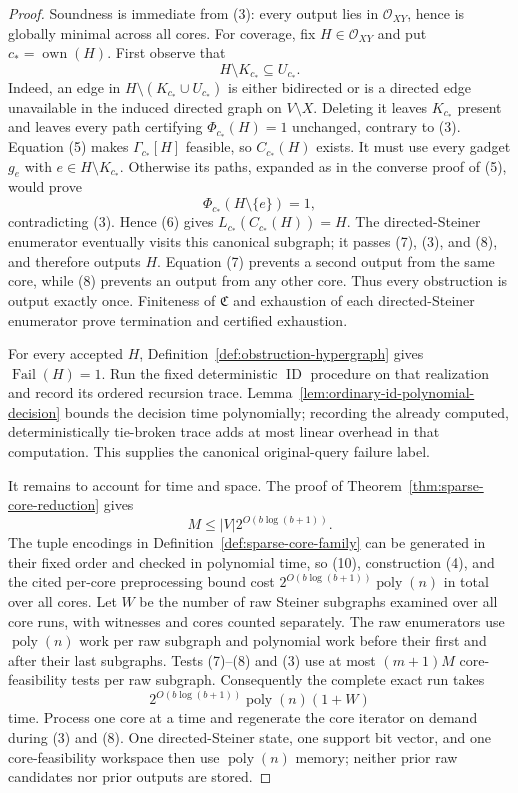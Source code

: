 \documentclass{article}
\begin{document}
\begin{proof}
Soundness is immediate from (3): every output lies in \(\mathcal O_{XY}\), hence is globally minimal across all cores.  For coverage, fix \(H\in\mathcal O_{XY}\) and put \(c_* =\operatorname{own}(H)\).  First observe that
\[
 H\setminus K_{c_*}\subseteq U_{c_*}.
 \tag{9}
\]
Indeed, an edge in \(H\setminus(K_{c_*}\cup U_{c_*})\) is either bidirected or is a directed edge unavailable in the induced directed graph on \(V\setminus X\).  Deleting it leaves \(K_{c_*}\) present and leaves every path certifying \(\Phi_{c_*}(H)=1\) unchanged, contrary to (3).  Equation (5) makes \(\Gamma_{c_*}[H]\) feasible, so \(C_{c_*}(H)\) exists.  It must use every gadget \(g_e\) with \(e\in H\setminus K_{c_*}\).  Otherwise its paths, expanded as in the converse proof of (5), would prove
\[
 \Phi_{c_*}(H\setminus\{e\})=1,
\]
contradicting (3).  Hence (6) gives \(L_{c_*}(C_{c_*}(H))=H\).  The directed-Steiner enumerator eventually visits this canonical subgraph; it passes (7), (3), and (8), and therefore outputs \(H\).  Equation (7) prevents a second output from the same core, while (8) prevents an output from any other core.  Thus every obstruction is output exactly once.  Finiteness of \(\mathfrak C\) and exhaustion of each directed-Steiner enumerator prove termination and certified exhaustion.

For every accepted \(H\), Definition~\ref{def:obstruction-hypergraph} gives \(\operatorname{Fail}(H)=1\).  Run the fixed deterministic \(\operatorname{ID}\) procedure on that realization and record its ordered recursion trace.  Lemma~\ref{lem:ordinary-id-polynomial-decision} bounds the decision time polynomially; recording the already computed, deterministically tie-broken trace adds at most linear overhead in that computation.  This supplies the canonical original-query failure label.

It remains to account for time and space.  The proof of Theorem~\ref{thm:sparse-core-reduction} gives
\[
 M\le |V|2^{O(b\log(b+1))}.
 \tag{10}
\]
The tuple encodings in Definition~\ref{def:sparse-core-family} can be generated in their fixed order and checked in polynomial time, so (10), construction (4), and the cited per-core preprocessing bound cost \(2^{O(b\log(b+1))}\operatorname{poly}(n)\) in total over all cores.  Let \(W\) be the number of raw Steiner subgraphs examined over all core runs, with witnesses and cores counted separately.  The raw enumerators use \(\operatorname{poly}(n)\) work per raw subgraph and polynomial work before their first and after their last subgraphs.  Tests (7)--(8) and (3) use at most \((m+1)M\) core-feasibility tests per raw subgraph.  Consequently the complete exact run takes
\[
 2^{O(b\log(b+1))}\operatorname{poly}(n)(1+W)
\tag{11}
\]
time.  Process one core at a time and regenerate the core iterator on demand during (3) and (8).  One directed-Steiner state, one support bit vector, and one core-feasibility workspace then use \(\operatorname{poly}(n)\) memory; neither prior raw candidates nor prior outputs are stored.


\end{proof}
\end{document}
